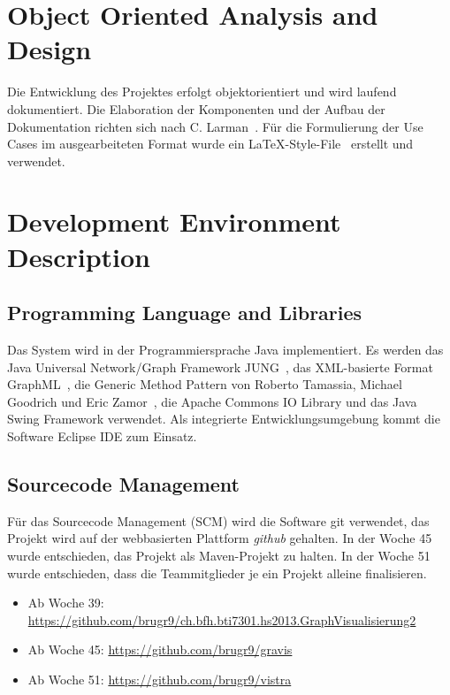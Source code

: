 \section{Object Oriented Analysis and Design}
\label{sec:Object Oriented Analysis and Design}
Die Entwicklung des Projektes erfolgt objektorientiert und wird laufend dokumentiert. Die Elaboration der Komponenten und der Aufbau der Dokumentation richten sich nach C. Larman~\cite{larmann:2004}. F\"ur die Formulierung der Use Cases im ausgearbeiteten Format wurde ein \LaTeX-Style-File~\cite{bruggmann:2013} erstellt und verwendet.
% 
\section{Development Environment Description}
\label{sec:Development Environment Description}
% 
\subsection{Programming Language and Libraries}
\label{subsec:Programming Language and Libraries}
Das System wird in der Programmiersprache Java implementiert. Es werden das Java Universal Network/Graph Framework JUNG~\cite{jung:2013}, das XML-basierte Format GraphML~\cite{graphml:2013}, die Generic Method Pattern von Roberto Tamassia, Michael Goodrich und Eric Zamor~\cite{tamassiagoodrichzamor:2013}, die Apache Commons IO Library und das Java Swing Framework verwendet. Als integrierte Entwicklungsumgebung kommt die Software Eclipse IDE zum Einsatz.
% 
\subsection{Sourcecode Management}
\label{subsec:Sourcecode Management}
F\"ur das Sourcecode Management (SCM) wird die Software git verwendet, das Projekt wird auf der webbasierten Plattform \textit{github} gehalten. In der Woche 45 wurde entschieden, das Projekt als Maven-Projekt zu halten. In der Woche 51 wurde entschieden, dass die Teammitglieder je ein Projekt alleine finalisieren.

\begin{itemize}
  \item Ab Woche 39: \url{https://github.com/brugr9/ch.bfh.bti7301.hs2013.GraphVisualisierung2}
  \item Ab Woche 45: \url{https://github.com/brugr9/gravis}
  \item Ab Woche 51: \url{https://github.com/brugr9/vistra}
\end{itemize}


